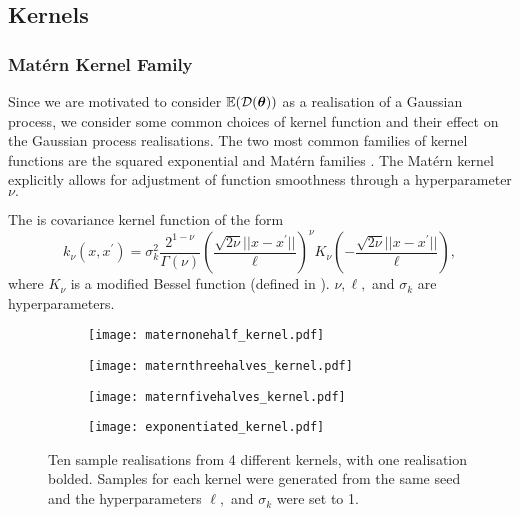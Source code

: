 \subsection*{Kernels}

\subsubsection*{Mat\'{e}rn Kernel Family}

Since we are motivated to consider $\operatorname{\mathbb{E}}(\mathcal{D}(\bm{\theta}))$ as a realisation of a
Gaussian process, we consider some common choices of kernel function and their
effect on the Gaussian process realisations. The two most common families of
kernel functions are the squared exponential
and Mat\'ern families \parencite{rasmussen_gaussian_2008}.
The Mat\'ern kernel explicitly allows for adjustment of function
smoothness through a hyperparameter $\nu.$

\begin{definition}
    The  is covariance kernel function of the form
    $$k_\nu(x, x^\prime)
        = \sigma^2_k \frac{2^{1 - \nu}}{\Gamma(\nu)}
        \left(\frac{\sqrt{2\nu}||x - x^\prime||}{\ell}\right)^\nu
        K_\nu\left(-\frac{\sqrt{2\nu}||x - x^\prime||}{\ell}\right),$$
    where $K_\nu$ is a modified Bessel function
    (defined in \cite[374]{abramowitz_handbook_2013}). $\nu, \ell,$ and
    $\sigma_k$ are hyperparameters.
\end{definition}

\begin{figure}[htbp]
    \centering
    \begin{subfigure}[b]{0.5\textwidth}
        \centering
        \texttt{[image: maternonehalf\_kernel.pdf]}
        \label{fig:mat_one_half}
    \end{subfigure}%
    \hfill%
    \begin{subfigure}[b]{0.5\textwidth}
        \centering
        \texttt{[image: maternthreehalves\_kernel.pdf]}
        \label{fig:mat_three_halves}
    \end{subfigure}
    \begin{subfigure}[b]{0.5\textwidth}
        \centering
        \texttt{[image: maternfivehalves\_kernel.pdf]}
        \label{fig:mat_five_halves}
    \end{subfigure}%
    \hfill%
    \begin{subfigure}[b]{0.5\textwidth}
        \centering
        \texttt{[image: exponentiated\_kernel.pdf]}
        \label{fig:squared_exp}
    \end{subfigure}%
    \caption[
        Gaussian process realisations with Mat\'ern and squared exponential
        kernels
    ]{
        Ten sample realisations from 4 different kernels, with one realisation
        bolded.
        Samples
        for each kernel were generated from the same seed and the
        hyperparameters $\ell,$ and $\sigma_k$ were set to 1.
    }
    \label{fig:kernels}
\end{figure}

